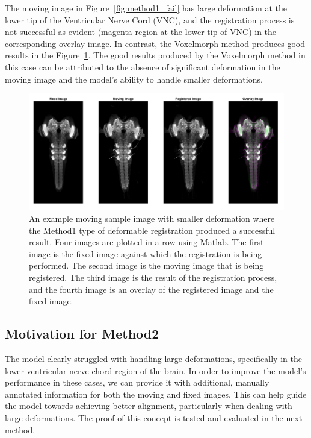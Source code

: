 \documentclass{report}
\begin{document}
	The moving image in Figure~\ref{fig:method1_fail} has large deformation at the lower tip of the Ventricular Nerve Cord (VNC), and the registration process is not successful as evident (magenta region at the lower tip of VNC) in the corresponding overlay image. In contrast, the Voxelmorph method produces good results in the Figure~\ref{fig:method1_pas}. The good results produced by the Voxelmorph method in this case can be attributed to the absence of significant deformation in the moving image and the model's ability to handle smaller deformations.
	
	\begin{figure}[h!]
		\centering
		\includegraphics[width=0.9\columnwidth]{resources/chapter4/np_brain7_scaled.tif.png}
		\caption{An example moving sample image with smaller deformation where the Method1 type of deformable registration produced a successful result. Four images are plotted in a row using Matlab. The first image is the fixed image against which the registration is being performed. The second image is the moving image that is being registered. The third image is the result of the registration process, and the fourth image is an overlay of the registered image and the fixed image.}
		\label{fig:method1_pas}
	\end{figure}
	
	\subsection{Motivation for Method2}
	The model clearly struggled with handling large deformations, specifically in the lower ventricular nerve chord region of the brain. In order to improve the model's performance in these cases, we can provide it with additional, manually annotated information for both the moving and fixed images. This can help guide the model towards achieving better alignment, particularly when dealing with large deformations. The proof of this concept is tested and evaluated in the next method.
	
\end{document}
